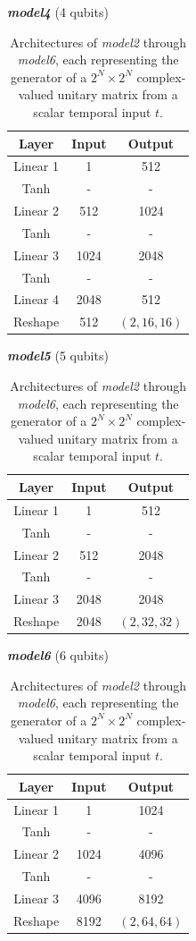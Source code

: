 \begin{table}[htbp]
\begin{minipage}[t]{0.48\textwidth}
\centering
\textbf{\textit{model4}} (4 qubits)\\[0.5ex]
\begin{tabular}{c|c|c}
\hline
\textbf{Layer} & \textbf{Input} & \textbf{Output} \\
\hline \hline
Linear 1 & 1 & 512 \\
Tanh & - & - \\
Linear 2 & 512 & 1024 \\
Tanh & - & - \\
Linear 3 & 1024 & 2048 \\
Tanh & - & - \\
Linear 4 & 2048 & 512 \\
Reshape & 512 & $(2,16,16)$ \\
\hline
\end{tabular}
\end{minipage}
\hfill
\begin{minipage}[t]{0.48\textwidth}
\centering
\textbf{\textit{model5}} (5 qubits)\\[0.5ex]
\begin{tabular}{c|c|c}
\hline
\textbf{Layer} & \textbf{Input} & \textbf{Output} \\
\hline \hline
Linear 1 & 1 & 512 \\
Tanh & - & - \\
Linear 2 & 512 & 2048 \\
Tanh & - & - \\
Linear 3 & 2048 & 2048 \\
Reshape & 2048 & $(2,32,32)$ \\
\hline
\end{tabular}
\end{minipage}

\medskip

\begin{minipage}[t]{0.48\textwidth}
\centering
\textbf{\textit{model6}} (6 qubits)\\[0.5ex]
\begin{tabular}{c|c|c}
\hline
\textbf{Layer} & \textbf{Input} & \textbf{Output} \\
\hline \hline
Linear 1 & 1 & 1024 \\
Tanh & - & - \\
Linear 2 & 1024 & 4096 \\
Tanh & - & - \\
Linear 3 & 4096 & 8192 \\
Reshape & 8192 & $(2,64,64)$ \\
\hline
\end{tabular}
\end{minipage}

\caption[Architectures of \textit{model2} through \textit{model6}]{Architectures of \textit{model2} through \textit{model6}, each representing the generator of a $2^N \times 2^N$ complex-valued unitary matrix from a scalar temporal input $t$.}
\label{tab:res-model-architecture}
\end{table}

